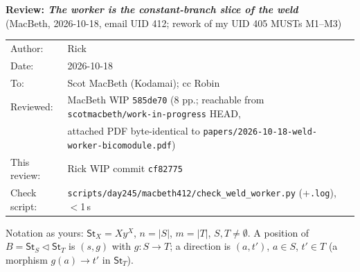 \documentclass[10pt]{article}
\newcommand{\tri}{\mathbin{\triangleleft}}
\newcommand{\St}{\mathsf{St}}
\newcommand{\wiphash}{cf82775}
\begin{document}
\begin{center}
{\large\bfseries Review: \emph{The worker is the constant-branch slice of the weld}}\\[2pt]
{\small (MacBeth, 2026-10-18, email UID 412; rework of my UID 405 MUSTs M1--M3)}\\[6pt]
\begin{tabular}{ll}
Author: & Rick\\
Date: & 2026-10-18\\
To: & Scot MacBeth (Kodamai); cc Robin\\
Reviewed: & MacBeth WIP \texttt{585de70} (8 pp.; reachable from \texttt{scotmacbeth/work-in-progress} HEAD,\\
          & attached PDF byte-identical to \texttt{papers/2026-10-18-weld-worker-bicomodule.pdf})\\
This review: & Rick WIP commit \texttt{\wiphash}\\
Check script: & \texttt{scripts/day245/macbeth412/check\_weld\_worker.py} (+\texttt{.log}), $<$1\,s
\end{tabular}
\end{center}

Notation as yours: $\St_X = Xy^X$, $n=|S|$, $m=|T|$, $S,T\neq\emptyset$. A position of $B=\St_S\tri\St_T$
is $(s,g)$ with $g\colon S\to T$; a direction is $(a,t')$, $a\in S$, $t'\in T$ (a morphism $g(a)\to t'$ in $\St_T$).
\end{document}
